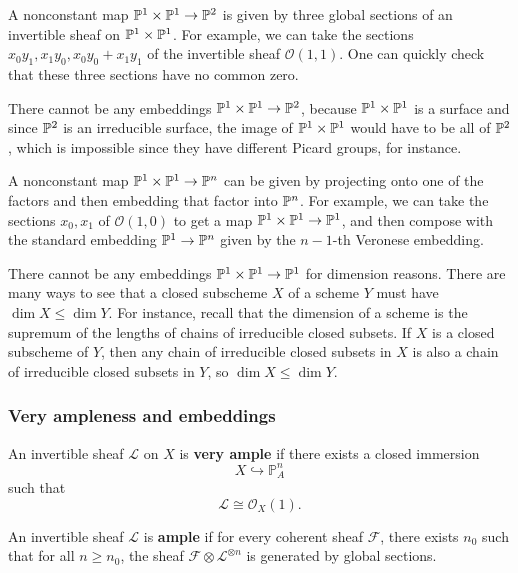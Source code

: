 \documentclass[12pt]{article}
\begin{document}
\begin{solution}
    A nonconstant map $\P^1\times \P^1 \to \P^2$ is given by three global sections of an invertible sheaf on $\P^1\times \P^1$. For example, we can take the sections $x_0y_1, x_1y_0, x_0y_0 + x_1y_1$ of the invertible sheaf $\mathcal O(1,1)$. One can quickly check that these three sections have no common zero.

    There cannot be any embeddings $\P^1\times \P^1 \to \P^2$, because $\P^1\times \P^1$ is a surface and since $\P^2$ is an irreducible surface, the image of $\P^1\times \P^1$ would have to be all of $\P^2$, which is impossible since they have different Picard groups, for instance.

    A nonconstant map $\P^1\times \P^1 \to \P^n$ can be given by projecting onto one of the factors and then embedding that factor into $\P^n$. For example, we can take the sections $x_0, x_1$ of $\mathcal O(1,0)$ to get a map $\P^1\times \P^1 \to \P^1$, and then compose with the standard embedding $\P^1 \to \P^n$ given by the $n-1$-th Veronese embedding.

    There cannot be any embeddings $\P^1\times \P^1 \to \P^1$ for dimension reasons. There are many ways to see that a closed subscheme $X$ of a scheme $Y$ must have $\dim X \le \dim Y$. For instance, recall that the dimension of a scheme is the supremum of the lengths of chains of irreducible closed subsets. If $X$ is a closed subscheme of $Y$, then any chain of irreducible closed subsets in $X$ is also a chain of irreducible closed subsets in $Y$, so $\dim X \le \dim Y$.
\end{solution}

\subsubsection{Very ampleness and embeddings}

\begin{definition}
    An invertible sheaf $\mathcal L$ on $X$ is \textbf{very ample} if there exists a closed immersion
    \[
        X \hookrightarrow \mathbb P^n_A
    \]
    such that
    \[
        \mathcal L \cong \mathcal O_X(1).
    \]
\end{definition}

\begin{definition}
    An invertible sheaf $\mathcal L$ is \textbf{ample} if for every coherent sheaf $\mathcal F$, there exists $n_0$ such that for all $n \ge n_0$, the sheaf $\mathcal F \otimes \mathcal L^{\otimes n}$ is generated by global sections.
\end{definition}
\end{document}
